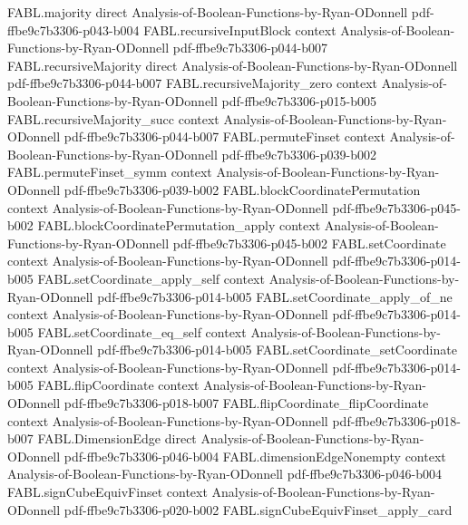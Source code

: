 \begin{theorem}
\proofstep
  {FABL.majority}
  {direct}
  {Analysis-of-Boolean-Functions-by-Ryan-ODonnell}
  {pdf-ffbe9c7b3306-p043-b004}
\proofstep
  {FABL.recursiveInputBlock}
  {context}
  {Analysis-of-Boolean-Functions-by-Ryan-ODonnell}
  {pdf-ffbe9c7b3306-p044-b007}
\proofstep
  {FABL.recursiveMajority}
  {direct}
  {Analysis-of-Boolean-Functions-by-Ryan-ODonnell}
  {pdf-ffbe9c7b3306-p044-b007}
\proofstep
  {FABL.recursiveMajority_zero}
  {context}
  {Analysis-of-Boolean-Functions-by-Ryan-ODonnell}
  {pdf-ffbe9c7b3306-p015-b005}
\proofstep
  {FABL.recursiveMajority_succ}
  {context}
  {Analysis-of-Boolean-Functions-by-Ryan-ODonnell}
  {pdf-ffbe9c7b3306-p044-b007}
\proofstep
  {FABL.permuteFinset}
  {context}
  {Analysis-of-Boolean-Functions-by-Ryan-ODonnell}
  {pdf-ffbe9c7b3306-p039-b002}
\proofstep
  {FABL.permuteFinset_symm}
  {context}
  {Analysis-of-Boolean-Functions-by-Ryan-ODonnell}
  {pdf-ffbe9c7b3306-p039-b002}
\proofstep
  {FABL.blockCoordinatePermutation}
  {context}
  {Analysis-of-Boolean-Functions-by-Ryan-ODonnell}
  {pdf-ffbe9c7b3306-p045-b002}
\proofstep
  {FABL.blockCoordinatePermutation_apply}
  {context}
  {Analysis-of-Boolean-Functions-by-Ryan-ODonnell}
  {pdf-ffbe9c7b3306-p045-b002}
\proofstep
  {FABL.setCoordinate}
  {context}
  {Analysis-of-Boolean-Functions-by-Ryan-ODonnell}
  {pdf-ffbe9c7b3306-p014-b005}
\proofstep
  {FABL.setCoordinate_apply_self}
  {context}
  {Analysis-of-Boolean-Functions-by-Ryan-ODonnell}
  {pdf-ffbe9c7b3306-p014-b005}
\proofstep
  {FABL.setCoordinate_apply_of_ne}
  {context}
  {Analysis-of-Boolean-Functions-by-Ryan-ODonnell}
  {pdf-ffbe9c7b3306-p014-b005}
\proofstep
  {FABL.setCoordinate_eq_self}
  {context}
  {Analysis-of-Boolean-Functions-by-Ryan-ODonnell}
  {pdf-ffbe9c7b3306-p014-b005}
\proofstep
  {FABL.setCoordinate_setCoordinate}
  {context}
  {Analysis-of-Boolean-Functions-by-Ryan-ODonnell}
  {pdf-ffbe9c7b3306-p014-b005}
\proofstep
  {FABL.flipCoordinate}
  {context}
  {Analysis-of-Boolean-Functions-by-Ryan-ODonnell}
  {pdf-ffbe9c7b3306-p018-b007}
\proofstep
  {FABL.flipCoordinate_flipCoordinate}
  {context}
  {Analysis-of-Boolean-Functions-by-Ryan-ODonnell}
  {pdf-ffbe9c7b3306-p018-b007}
\proofstep
  {FABL.DimensionEdge}
  {direct}
  {Analysis-of-Boolean-Functions-by-Ryan-ODonnell}
  {pdf-ffbe9c7b3306-p046-b004}
\proofstep
  {FABL.dimensionEdgeNonempty}
  {context}
  {Analysis-of-Boolean-Functions-by-Ryan-ODonnell}
  {pdf-ffbe9c7b3306-p046-b004}
\proofstep
  {FABL.signCubeEquivFinset}
  {context}
  {Analysis-of-Boolean-Functions-by-Ryan-ODonnell}
  {pdf-ffbe9c7b3306-p020-b002}
\proofstep
  {FABL.signCubeEquivFinset_apply_card}

\end{theorem}
